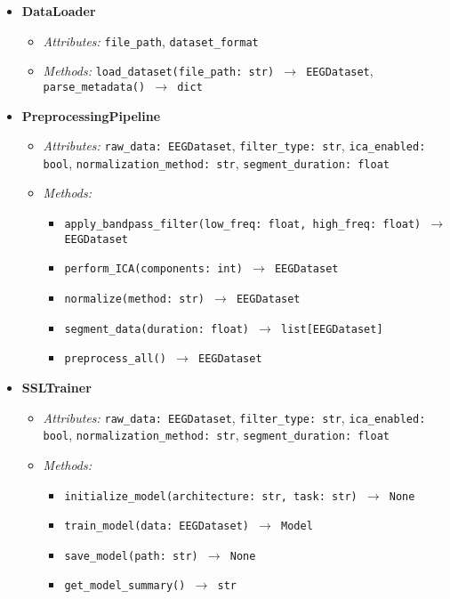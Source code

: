 \begin{itemize}
    \item \textbf{DataLoader}
    \begin{itemize}
        \item \textit{Attributes:} \texttt{file\_path}, \texttt{dataset\_format}
        \item \textit{Methods:} \texttt{load\_dataset(file\_path: str) $\rightarrow$ EEGDataset}, \texttt{parse\_metadata() $\rightarrow$ dict}
    \end{itemize}

    \item \textbf{PreprocessingPipeline}
    \begin{itemize}
        \item \textit{Attributes:} \texttt{raw\_data: EEGDataset}, \texttt{filter\_type: str}, \texttt{ica\_enabled: bool}, \texttt{normalization\_method: str}, \texttt{segment\_duration: float}
        \item \textit{Methods:}
        \begin{itemize}
            \item \texttt{apply\_bandpass\_filter(low\_freq: float, high\_freq: float) $\rightarrow$ EEGDataset}
            \item \texttt{perform\_ICA(components: int) $\rightarrow$ EEGDataset}
            \item \texttt{normalize(method: str) $\rightarrow$ EEGDataset}
            \item \texttt{segment\_data(duration: float) $\rightarrow$ list[EEGDataset]}
            \item \texttt{preprocess\_all() $\rightarrow$ EEGDataset}
        \end{itemize}
    \end{itemize}

    \item \textbf{SSLTrainer}
    \begin{itemize}
        \item \textit{Attributes:} \texttt{raw\_data: EEGDataset}, \texttt{filter\_type: str}, \texttt{ica\_enabled: bool}, \texttt{normalization\_method: str}, \texttt{segment\_duration: float}
        \item \textit{Methods:}
        \begin{itemize}
            \item \texttt{initialize\_model(architecture: str, task: str) $\rightarrow$ None}
            \item \texttt{train\_model(data: EEGDataset) $\rightarrow$ Model}
            \item \texttt{save\_model(path: str) $\rightarrow$ None}
            \item \texttt{get\_model\_summary() $\rightarrow$ str}
        \end{itemize}
    \end{itemize}


\end{itemize}
